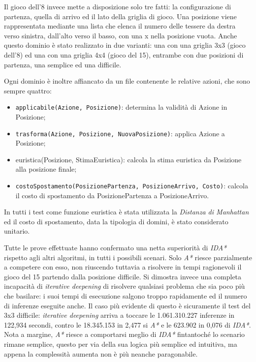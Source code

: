 \documentclass[a4paper,oneside,12pt]{book}
\def \code#1{\texttt{#1}}
\begin{document}
    Il gioco dell’8 invece mette a disposizione solo tre fatti: la configurazione di partenza, quella di arrivo ed il lato della griglia di gioco. Una posizione viene rappresentata mediante una lista che elenca il numero delle tessere da destra verso sinistra, dall’alto verso il basso, con una x nella posizione vuota. Anche questo dominio è stato realizzato in due varianti: una con una griglia 3x3 (gioco dell’8) ed una con una griglia 4x4 (gioco del 15), entrambe con due posizioni di partenza, una semplice ed una difficile.

    Ogni dominio è inoltre affiancato da un file contenente le relative azioni, che sono sempre quattro:

    \begin{itemize}
        \item \code{applicabile(Azione, Posizione)}: determina la validità di Azione in Posizione;
        \item \code{trasforma(Azione, Posizione, NuovaPosizione)}: applica Azione a Posizione;
        \item euristica(Posizione, StimaEuristica): calcola la stima euristica da Posizione alla posizione finale;
        \item \code{costoSpostamento(PosizionePartenza, PosizioneArrivo, Costo)}: calcola il costo di spostamento da PosizionePartenza a PosizioneArrivo.
    \end{itemize}
    In tutti i test come funzione euristica è stata utilizzata la \textit{Distanza di Manhattan} ed il costo di spostamento, data la tipologia di domini, è stato considerato unitario.

    Tutte le prove effettuate hanno confermato una netta superiorità di \textit{IDA*} rispetto agli altri algoritmi, in tutti i possibili scenari. Solo \textit{A*} riesce parzialmente a competere con esso, non riuscendo tuttavia a risolvere in tempi ragionevoli il gioco del 15 partendo dalla posizione difficile. Si dimostra invece una completa incapacità di \textit{iterative deepening} di risolvere qualsiasi problema che sia poco più che basilare: i suoi tempi di esecuzione salgono troppo rapidamente ed il numero di inferenze eseguite anche. Il caso più evidente di questo è sicuramente il test del 3x3 difficile: \textit{iterative deepening} arriva a toccare le 1.061.310.227 inferenze in 122,934 secondi, contro le 18.345.153 in 2,477 si \textit{A*} e le 623.902 in 0,076 di \textit{IDA*}. Nota a margine, \textit{A*} riesce a comportarsi meglio di \textit{IDA*} fintantoché lo scenario rimane semplice, questo per via della sua logica più semplice ed intuitiva, ma appena la complessità aumenta non è più neanche paragonabile.
\end{document}
